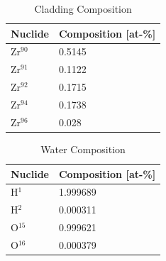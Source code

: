     \begin{table}[<options>]
        \caption{Cladding Composition}
        \label{tab:clad-comp}
        \begin{tabular*}{\tblwidth}{@{}LL@{}}
            \toprule
            Nuclide & Composition [at-\%] \\ %
            \midrule
             Zr$^{90}$ & 0.5145 \\
             Zr$^{91}$ & 0.1122 \\
             Zr$^{92}$ & 0.1715 \\
             Zr$^{94}$ & 0.1738 \\
             Zr$^{96}$ & 0.028 \\ 
             \bottomrule
        \end{tabular*}
    \end{table}

    \begin{table}[<options>]
        \caption{Water Composition}
        \label{tab:water-comp}
        \begin{tabular*}{\tblwidth}{@{}LL@{}}
            \toprule
            Nuclide & Composition [at-\%] \\ %
            \midrule
             H$^{1}$ & 1.999689\\
             H$^{2}$ & 0.000311 \\
             O$^{15}$ & 0.999621 \\
             O$^{16}$ & 0.000379 \\
             \bottomrule
        \end{tabular*}
    \end{table}


